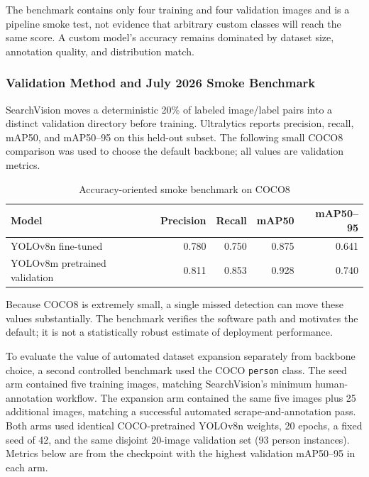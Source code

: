 \documentclass[12pt, letterpaper]{article}
\newcommand{\code}[1]{\texttt{\small\colorbox{codebg}{#1}}}
\begin{document}
The benchmark contains only four training and four validation images and is a pipeline
smoke test, not evidence that arbitrary custom classes will reach the same score. A custom
model's accuracy remains dominated by dataset size, annotation quality, and distribution match.

\subsubsection{Validation Method and July 2026 Smoke Benchmark}

SearchVision moves a deterministic 20\% of labeled image/label pairs into a distinct
validation directory before training. Ultralytics reports precision, recall, mAP50, and
mAP50--95 on this held-out subset. The following small COCO8 comparison was used to choose
the default backbone; all values are validation metrics.

\begin{table}[H]
  \centering
  \caption{Accuracy-oriented smoke benchmark on COCO8}
  \begin{tabular}{@{} l r r r r @{} }
    \toprule
    \textbf{Model} & \textbf{Precision} & \textbf{Recall} & \textbf{mAP50} & \textbf{mAP50--95} \\
    \midrule
    YOLOv8n fine-tuned & 0.780 & 0.750 & 0.875 & 0.641 \\
    YOLOv8m pretrained validation & 0.811 & 0.853 & 0.928 & 0.740 \\
    \bottomrule
  \end{tabular}
\end{table}

Because COCO8 is extremely small, a single missed detection can move these values
substantially. The benchmark verifies the software path and motivates the default; it is
not a statistically robust estimate of deployment performance.

To evaluate the value of automated dataset expansion separately from backbone choice, a
second controlled benchmark used the COCO \code{person} class. The seed arm contained five
training images, matching SearchVision's minimum human-annotation workflow. The expansion
arm contained the same five images plus 25 additional images, matching a successful
automated scrape-and-annotation pass. Both arms used identical COCO-pretrained YOLOv8n
weights, 20 epochs, a fixed seed of 42, and the same disjoint 20-image validation set
(93 person instances). Metrics below are from the checkpoint with the highest validation
mAP50--95 in each arm.
\end{document}
